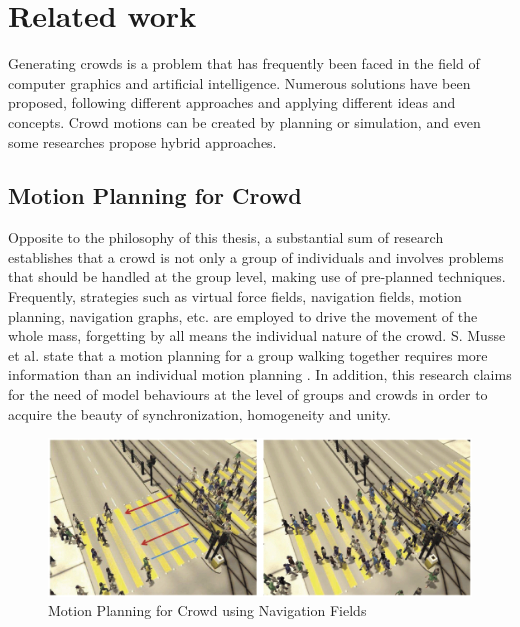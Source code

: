 \ifx\isEmbedded\undefined

\graphicspath{{../img/}}

\fi

\chapter{Related work}
\label{chap:related}

Generating crowds is a problem that has frequently been faced in the field of computer graphics and artificial intelligence. Numerous solutions have been proposed, following different approaches and applying different ideas and concepts. Crowd motions can be created by planning or simulation, and even some researches propose hybrid approaches.

\section{Motion Planning for Crowd}

Opposite to the philosophy of this thesis, a substantial sum of research establishes that a crowd is not only a group of individuals and involves problems that should be handled at the group level, making use of pre-planned techniques. Frequently, strategies such as virtual force fields, navigation fields, motion planning, navigation graphs, etc. are employed to drive the movement of the whole mass, forgetting by all means the individual nature of the crowd. S. Musse et al. state that a motion planning for a group walking together requires more information than an individual motion planning \citep{musse1}. In addition, this research claims for the need of model behaviours at the level of groups and crowds in order to acquire the beauty of synchronization, homogeneity and unity.

\begin{figure}[!htb]
  \centering
  \includegraphics[scale=0.4]{navigation_fields.eps}
  \caption[Motion Planning for Crowd]{Motion Planning for Crowd using Navigation Fields \citep{patil}}
  \label{fig:navigation}
\end{figure}

